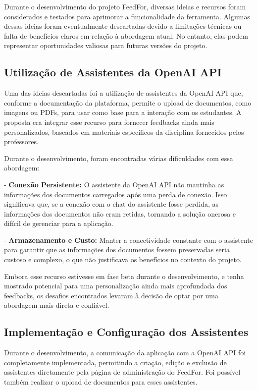 Durante o desenvolvimento do projeto FeedFor, diversas ideias e recursos foram considerados e testados para aprimorar a funcionalidade da ferramenta. Algumas dessas ideias foram eventualmente descartadas devido a limitações técnicas ou falta de benefícios claros em relação à abordagem atual. No entanto, elas podem representar oportunidades valiosas para futuras versões do projeto.

\subsection{Utilização de Assistentes da OpenAI API}

Uma das ideias descartadas foi a utilização de assistentes da OpenAI API que, conforme a documentação da plataforma, permite o upload de documentos, como imagens ou PDFs, para usar como base para a interação com os estudantes. A proposta era integrar esse recurso para fornecer feedbacks ainda mais personalizados, baseados em materiais específicos da disciplina fornecidos pelos professores.

Durante o desenvolvimento, foram encontradas várias dificuldades com essa abordagem:

- \textbf{Conexão Persistente:} O assistente da OpenAI API não mantinha as informações dos documentos carregados após uma perda de conexão. Isso significava que, se a conexão com o chat do assistente fosse perdida, as informações dos documentos não eram retidas, tornando a solução onerosa e difícil de gerenciar para a aplicação.

- \textbf{Armazenamento e Custo:} Manter a conectividade constante com o assistente para garantir que as informações dos documentos fossem preservadas seria custoso e complexo, o que não justificava os benefícios no contexto do projeto.

Embora esse recurso estivesse em fase beta durante o desenvolvimento, e tenha mostrado potencial para uma personalização ainda mais aprofundada dos feedbacks, os desafios encontrados levaram à decisão de optar por uma abordagem mais direta e confiável.

\subsection{Implementação e Configuração dos Assistentes}

Durante o desenvolvimento, a comunicação da aplicação com a OpenAI API foi completamente implementada, permitindo a criação, edição e exclusão de assistentes diretamente pela página de administração do FeedFor. Foi possível também realizar o upload de documentos para esses assistentes.

